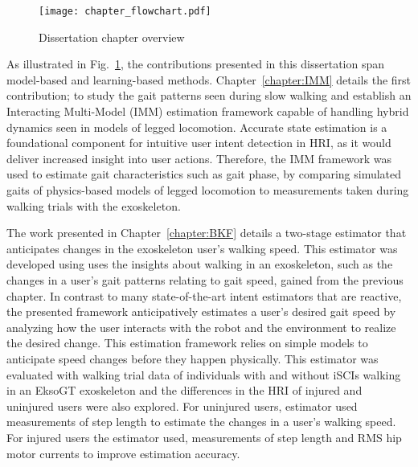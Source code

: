 \begin{figure}
	\centering
	\texttt{[image: chapter\_flowchart.pdf]}
	\caption{Dissertation chapter overview \label{fig:chapter_flowchart}}
\end{figure}

As illustrated in Fig.~\ref{fig:chapter_flowchart}, the contributions presented in this dissertation span model-based and learning-based methods. Chapter~\ref{chapter:IMM} details the first contribution; to study the gait patterns seen during slow walking and establish an Interacting Multi-Model (IMM) estimation framework capable of handling hybrid dynamics seen in models of legged locomotion. Accurate state estimation is a foundational component for intuitive user intent detection in HRI, as it would deliver increased insight into user actions. Therefore, the IMM framework was used to estimate gait characteristics such as gait phase, by comparing simulated gaits of physics-based models of legged locomotion to measurements taken during walking trials with the exoskeleton. 

The work presented in Chapter~\ref{chapter:BKF} details a two-stage estimator that anticipates changes in the exoskeleton user’s walking speed. This estimator was developed using  uses the insights about walking in an exoskeleton, such as the changes in a user's gait patterns relating to gait speed, gained from the previous chapter. In contrast to many state-of-the-art intent estimators that are reactive, the presented framework anticipatively estimates a user's desired gait speed by analyzing how the user interacts with the robot and the environment to realize the desired change. This estimation framework relies on simple models to anticipate speed changes before they happen physically. This estimator was evaluated with walking trial data of individuals with and without iSCIs walking in an EksoGT exoskeleton and the differences in the HRI of injured and uninjured users were also explored. For uninjured users, estimator used measurements of step length to estimate the changes in a user's walking speed. For injured users the estimator used, measurements of step length and RMS hip motor currents to improve estimation accuracy.

